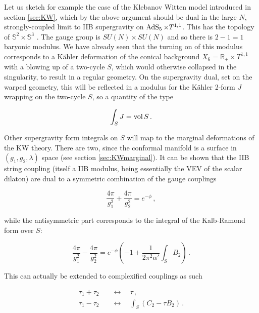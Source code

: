 Let us sketch for example the case of the Klebanov Witten model \cite{KW_SCFT} introduced in section \ref{sec:KW}, which by the above argument should be dual in the large $N$, strongly-coupled limit to IIB supergravity on $\operatorname{AdS}_{5} \times T^{1,1}$. This has the topology of $\mathbb{S}^2 \times \mathbb{S}^3$ \cite{Candelas}. The gauge group is $SU(N)\times SU(N)$ and so there is $2-1 = 1$ baryonic modulus. We have already seen that the turning on of this modulus corresponds to a K\"ahler deformation of the conical background $X_6 = \mathbb{R}_+ \times T^{1,1}$ with a blowing up of a two-cycle $S$, which would otherwise collapsed in the singularity, to result in a regular geometry. On the supergravity dual, set on the warped geometry, this will be reflected in a modulus for the K\"ahler 2-form $J$ wrapping on the two-cycle $S$, so a quantity of the type

\begin{equation}
	\int_S J = \operatorname{vol} S\,.
	\label{}
\end{equation}

Other supergravity form integrals on $S$ will map to the marginal deformations of the KW theory. There are two, since the conformal manifold is a surface in $(g_1,g_2,\lambda)$ space (see section \ref{sec:KWmarginal}). It can be shown \cite{erdmenger} that the IIB string coupling (itself a IIB modulus, being essentially the VEV of the scalar dilaton) are dual to a symmetric combination of the gauge couplings

\begin{equation}
	\frac{4\pi}{g_1^2} + \frac{4\pi}{g_2^2} = e^{-\phi}\,,
	\label{}
\end{equation}

while the antisymmetric part corresponds to the integral of the Kalb-Ra\-mond form over $S$:

\begin{equation}	
	\frac{4\pi}{g_1^2} - \frac{4\pi}{g_2^2} = e^{-\phi} \left( -1 + \frac{1}{2\pi^2 \alpha'} \int_{S} B_2 \right)\,.
	\label{}
\end{equation}

This can actually be extended to complexified couplings as such

\begin{align}
	\tau_1 + \tau_2 \quad &\longleftrightarrow \quad \tau\,, \\
	\tau_1 - \tau_2 \quad &\longleftrightarrow \quad \int_{S} (C_2 -  \tau B_2)\,.
\end{align}

